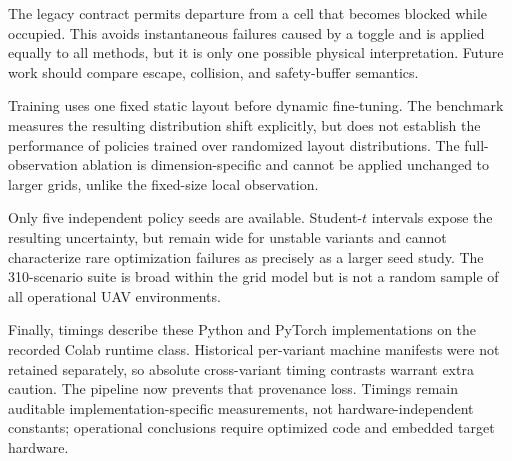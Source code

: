 The legacy contract permits departure from a cell that becomes blocked while
occupied. This avoids instantaneous failures caused by a toggle and is applied
equally to all methods, but it is only one possible physical interpretation.
Future work should compare escape, collision, and safety-buffer semantics.

Training uses one fixed static layout before dynamic fine-tuning. The benchmark
measures the resulting distribution shift explicitly, but does not establish
the performance of policies trained over randomized layout distributions.
The full-observation ablation is dimension-specific and cannot be applied
unchanged to larger grids, unlike the fixed-size local observation.

Only five independent policy seeds are available. Student-$t$ intervals expose
the resulting uncertainty, but remain wide for unstable variants and cannot
characterize rare optimization failures as precisely as a larger seed study.
The 310-scenario suite is broad within the grid model but is not a random sample
of all operational UAV environments.

Finally, timings describe these Python and PyTorch implementations on the
recorded Colab runtime class. Historical per-variant machine manifests were not
retained separately, so absolute cross-variant timing contrasts warrant extra
caution. The pipeline now prevents that provenance loss. Timings remain
auditable implementation-specific measurements, not hardware-independent
constants; operational conclusions require optimized code and embedded target
hardware.
